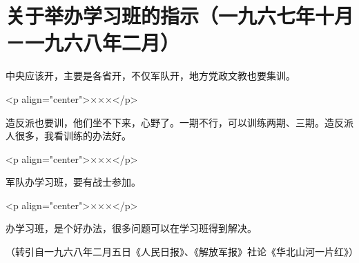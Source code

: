 \section[关于举办学习班的指示（一九六七年十月－一九六八年二月）]{关于举办学习班的指示（一九六七年十月－一九六八年二月）}


中央应该开，主要是各省开，不仅军队开，地方党政文教也要集训。

<p align="center">×××</p>

造反派也要训，他们坐不下来，心野了。一期不行，可以训练两期、三期。造反派人很多，我看训练的办法好。

<p align="center">×××</p>

军队办学习班，要有战士参加。

<p align="center">×××</p>

办学习班，是个好办法，很多问题可以在学习班得到解决。

{\raggedleft （转引自一九六八年二月五日《人民日报》、《解放军报》社论《华北山河一片红》）\par}


